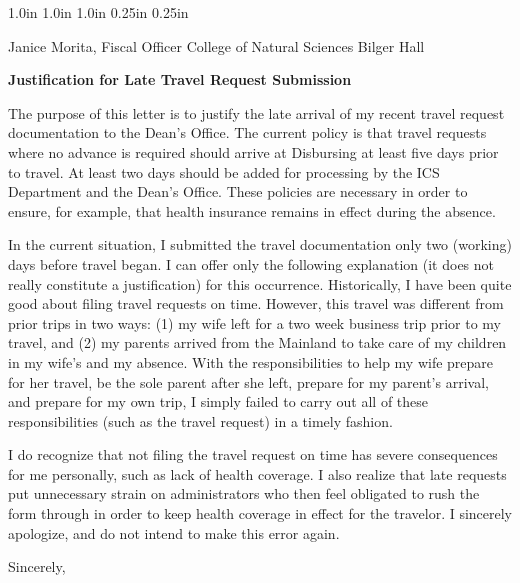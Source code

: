 
 {1.0in}  {1.0in} {1.0in} {0.25in} {0.25in}



\signature {Philip Johnson, Ph.D.\\
            Associate Professor}

\address{548 Kaimake Loop\\
         Kailua, HI 96734}
\indentclosing

\begin {letter}
  {
  Janice Morita, Fiscal Officer
  College of Natural Sciences
  Bilger Hall
  }


\opening {{\bf Justification for Late Travel Request Submission}}

The purpose of this letter is to justify the late arrival of my recent
travel request documentation to the Dean's Office.  The current policy is
that travel requests where no advance is required should arrive at
Disbursing at least five days prior to travel.  At least two days should be
added for processing by the ICS Department and the Dean's Office.
These policies are necessary in order to ensure, for example, that 
health insurance remains in effect during the absence. 

In the current situation, I submitted the travel documentation only two
(working) days before travel began.  I can offer only the following
explanation (it does not really constitute a justification) for this
occurrence. Historically, I have been quite good about filing travel
requests on time.  However, this travel was different from prior trips in
two ways: (1) my wife left for a two week business trip prior to my travel,
and (2) my parents arrived from the Mainland to take care of my children in
my wife's and my absence.  With the responsibilities to help my wife
prepare for her travel, be the sole parent after she left, prepare for my
parent's arrival, and prepare for my own trip, I simply failed to 
carry out all of these responsibilities (such as the travel request) in a
timely fashion.  

I do recognize that not filing the travel request on time has severe
consequences for me personally, such as lack of health coverage. I also
realize that late requests put unnecessary strain on administrators who
then feel obligated to rush the form through in order to keep health
coverage in effect for the travelor.  I sincerely apologize, and do not
intend to make this error again.

\closing{Sincerely,}

\end{letter}

